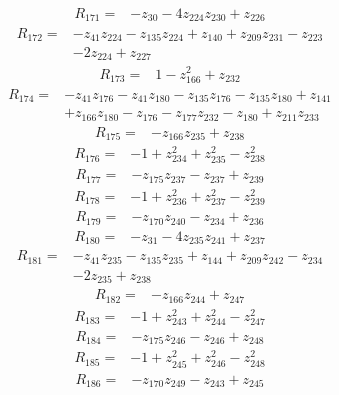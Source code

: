 \begin{align*}
R_{171}={}&-z_{30}-4z_{224}z_{230}+z_{226}
\end{align*}
\begin{align*}
R_{172}={}&-z_{41}z_{224}-z_{135}z_{224}+z_{140}+z_{209}z_{231}-z_{223}\\
&-2z_{224}+z_{227}
\end{align*}
\begin{align*}
R_{173}={}&1-z_{166}^{2}+z_{232}
\end{align*}
\begin{align*}
R_{174}={}&-z_{41}z_{176}-z_{41}z_{180}-z_{135}z_{176}-z_{135}z_{180}+z_{141}\\
&+z_{166}z_{180}-z_{176}-z_{177}z_{232}-z_{180}+z_{211}z_{233}
\end{align*}
\begin{align*}
R_{175}={}&-z_{166}z_{235}+z_{238}
\end{align*}
\begin{align*}
R_{176}={}&-1+z_{234}^{2}+z_{235}^{2}-z_{238}^{2}
\end{align*}
\begin{align*}
R_{177}={}&-z_{175}z_{237}-z_{237}+z_{239}
\end{align*}
\begin{align*}
R_{178}={}&-1+z_{236}^{2}+z_{237}^{2}-z_{239}^{2}
\end{align*}
\begin{align*}
R_{179}={}&-z_{170}z_{240}-z_{234}+z_{236}
\end{align*}
\begin{align*}
R_{180}={}&-z_{31}-4z_{235}z_{241}+z_{237}
\end{align*}
\begin{align*}
R_{181}={}&-z_{41}z_{235}-z_{135}z_{235}+z_{144}+z_{209}z_{242}-z_{234}\\
&-2z_{235}+z_{238}
\end{align*}
\begin{align*}
R_{182}={}&-z_{166}z_{244}+z_{247}
\end{align*}
\begin{align*}
R_{183}={}&-1+z_{243}^{2}+z_{244}^{2}-z_{247}^{2}
\end{align*}
\begin{align*}
R_{184}={}&-z_{175}z_{246}-z_{246}+z_{248}
\end{align*}
\begin{align*}
R_{185}={}&-1+z_{245}^{2}+z_{246}^{2}-z_{248}^{2}
\end{align*}
\begin{align*}
R_{186}={}&-z_{170}z_{249}-z_{243}+z_{245}
\end{align*}
